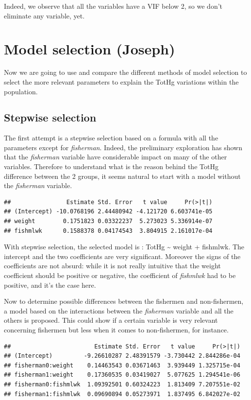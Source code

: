 \documentclass[12pt,]{article}
\begin{document}
Indeed, we observe that all the variables have a VIF below 2, so we
don't eliminate any variable, yet.

\section{Model selection (Joseph)}\label{model-selection-joseph}

Now we are going to use and compare the different methods of model
selection to select the more relevant parameters to explain the TotHg
variations within the population.

\subsection{Stepwise selection}\label{stepwise-selection}

The first attempt is a stepwise selection based on a formula with all
the parameters except for \emph{fisherman}. Indeed, the preliminary
exploration has shown that the \emph{fisherman} variable have
considerable impact on many of the other variables. Therefore to
understand what is the reason behind the TotHg difference between the 2
groups, it seems natural to start with a model without the
\emph{fisherman} variable.

\begin{verbatim}
##                Estimate Std. Error   t value     Pr(>|t|)
## (Intercept) -10.0768196 2.44480942 -4.121720 6.603741e-05
## weight        0.1751823 0.03322237  5.273023 5.336914e-07
## fishmlwk      0.1588378 0.04174543  3.804915 2.161017e-04
\end{verbatim}

With stepwise selection, the selected model is : TotHg \textasciitilde{}
weight + fishmlwk. The intercept and the two coefficients are very
significant. Moreover the signs of the coefficients are not absurd:
while it is not really intuitive that the weight coefficient should be
positive or negative, the coefficient of \emph{fishmlwk} had to be
positive, and it's the case here.

Now to determine possible differences between the fishermen and
non-fishermen, a model based on the interactions between the
\emph{fisherman} variable and all the others is proposed. This could
show if a certain variable is very relevant concerning fishermen but
less when it comes to non-fishermen, for instance.

\begin{verbatim}
##                        Estimate Std. Error   t value     Pr(>|t|)
## (Intercept)         -9.26610287 2.48391579 -3.730442 2.844286e-04
## fisherman0:weight    0.14463543 0.03671463  3.939449 1.325715e-04
## fisherman1:weight    0.17360535 0.03419027  5.077625 1.294541e-06
## fisherman0:fishmlwk  1.09392501 0.60324223  1.813409 7.207551e-02
## fisherman1:fishmlwk  0.09690894 0.05273971  1.837495 6.842027e-02
\end{verbatim}
\end{document}
